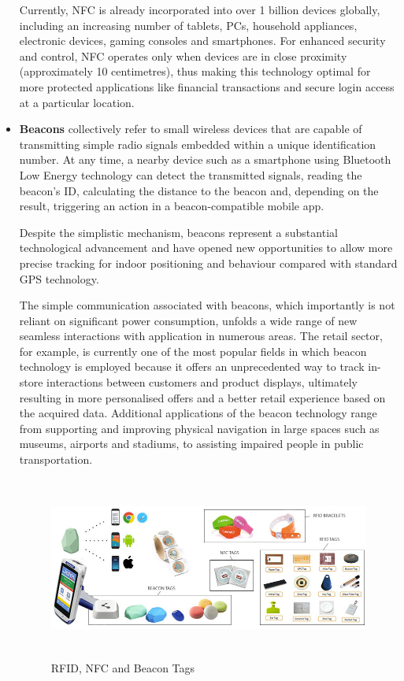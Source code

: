 \begin{itemize}
  Currently, NFC is already incorporated into over 1 billion devices globally, including an increasing number of tablets, PCs, household appliances, electronic devices, gaming consoles and smartphones. For enhanced security and control, NFC operates only when devices are in close proximity (approximately 10 centimetres), thus making this technology optimal for more protected applications like financial transactions and secure login access at a particular location. 
 
  \item \textbf{Beacons} \label{beacons} collectively refer to small wireless devices that are capable of transmitting simple radio signals embedded within a unique identification number. At any time, a nearby device such as a smartphone using Bluetooth Low Energy technology can detect the transmitted signals, reading the beacon’s ID, calculating the distance to the beacon and, depending on the result, triggering an action in a beacon-compatible mobile app. 
  
  Despite the simplistic mechanism, beacons represent a substantial technological advancement and have opened new opportunities to allow more precise tracking for indoor positioning and behaviour compared with standard GPS technology.
  
  The simple communication associated with beacons, which importantly is not reliant on significant power consumption, unfolds a wide range of new seamless interactions with application in numerous areas. The retail sector, for example, is currently one of the most popular fields in which beacon technology is employed because it offers an unprecedented way to track in-store interactions between customers and product displays, ultimately resulting in more personalised offers and a better retail experience based on the acquired data. Additional applications of the beacon technology range from supporting and improving physical navigation in large spaces such as museums, airports and stadiums, to assisting impaired people in public transportation.

  \vspace{0.5cm}
  \begin{figure}[htbp]
    \centering
      \includegraphics[height=6cm]{images/iot-devices.jpg}
    \caption{RFID, NFC and Beacon Tags}
    \label{fig:devices}
  \end{figure}
  \vspace{0.5cm}


\end{itemize}
